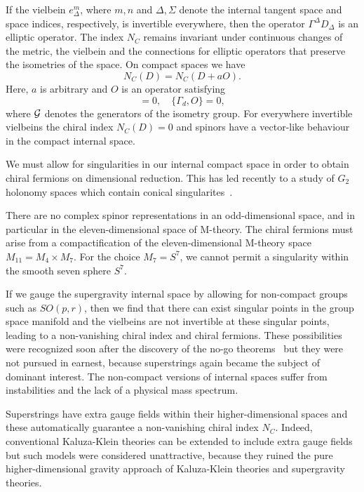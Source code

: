 \documentclass[a4paper,12pt]{article}
\begin{document}
If the vielbein $e^m_\Delta$, where $m,n$ and $\Delta,\Sigma$
denote the internal tangent space and space indices,
respectively, is invertible everywhere, then the operator
$\Gamma^\Delta D_\Delta$ is an elliptic operator. The index $N_C$
remains invariant under continuous changes of the metric, the
vielbein and the connections for elliptic operators that
preserve the isometries of the space. On compact spaces we
have~\cite{Witten}
\begin{equation}
N_C(D)=N_C(D+aO).
\end{equation}
Here, $a$ is arbitrary and $O$ is an operator satisfying
\begin{equation}
[{\cal G},O]=0,\quad \{\Gamma_d,O\}=0,
\end{equation}
where ${\cal G}$ denotes the generators of the isometry group. For
everywhere invertible vielbeins the chiral index $N_C(D)=0$ and
spinors have a vector-like behaviour in the compact internal
space.

We must allow for singularities in our internal compact space in order to
obtain chiral fermions on dimensional reduction. This has led recently to a
study of $G_2$ holonomy spaces which contain conical
singularites~\cite{Acharya,Witten2,Witten3}.

There are no complex spinor representations in an odd-dimensional space, and in
particular in the eleven-dimensional space of M-theory. The chiral fermions must
arise from a compactification of the eleven-dimensional M-theory
space $M_{11}=M_4\times M_7$. For the choice $M_7=S^7$, we
cannot permit a singularity within the smooth seven sphere $S^7$.

If we gauge the
supergravity internal space by allowing for non-compact groups such as
$SO(p,r)$, then we find that there can exist singular points in the group space
manifold and the vielbeins are not invertible at these singular points, leading to a
non-vanishing chiral index and chiral fermions. These possibilities were recognized
soon after the discovery of the no-go
theorems~\cite{Wetterich,Zwiebach,Moffat} but they were not pursued in
earnest, because superstrings again became the subject of dominant interest. The
non-compact versions of internal spaces suffer from instabilities and the lack of a
physical mass spectrum.

Superstrings have extra gauge fields within their
higher-dimensional spaces and these automatically guarantee a non-vanishing chiral
index $N_C$. Indeed, conventional Kaluza-Klein theories can be extended to include
extra gauge fields~\cite{Salam} but such models were considered unattractive,
because they ruined the pure higher-dimensional gravity approach of Kaluza-Klein
theories and supergravity theories.
\end{document}
